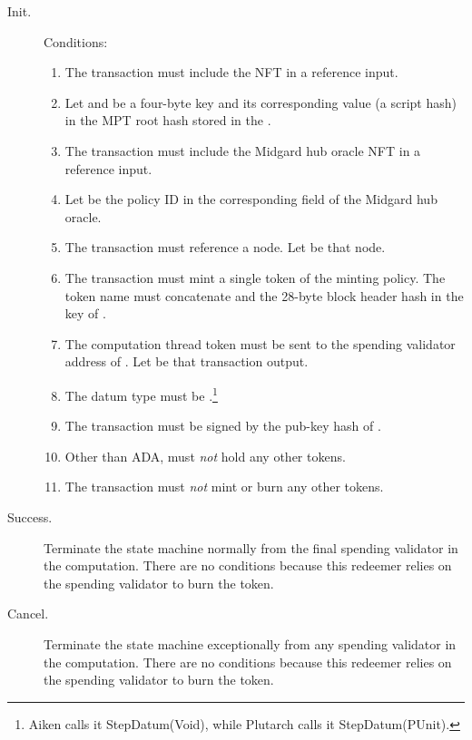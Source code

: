\documentclass[../midgard.tex]{subfiles}
\begin{document}
\begin{description}
    \item[Init.] Conditions:
        \begin{enumerate}
            \item The transaction must include the  NFT in a reference input.
            \item Let  and  be a four-byte key and its corresponding value (a script hash) in the MPT root hash stored in the .
            \item The transaction must include the Midgard hub oracle NFT in a reference input.
            \item Let  be the policy ID in the corresponding field of the Midgard hub oracle.
            \item The transaction must reference a  node.
              Let  be that node.
            \item The transaction must mint a single token of the  minting policy.
              The token name must concatenate  and the 28-byte block header hash in the key of .
            \item The computation thread token must be sent to the spending validator address of .
              Let  be that transaction output.
            \item The  datum type must be .\footnote{Aiken calls it StepDatum(Void), while Plutarch calls it StepDatum(PUnit).} 
            \item The transaction must be signed by the  pub-key hash of .
            \item Other than ADA,  must \emph{not} hold any other tokens.
            \item The transaction must \emph{not} mint or burn any other tokens.
        \end{enumerate}
    \item[Success.] Terminate the state machine normally from the final spending validator in the computation.
      There are no conditions because this redeemer relies on the spending validator to burn the token.
    \item[Cancel.] Terminate the state machine exceptionally from any spending validator in the computation.
      There are no conditions because this redeemer relies on the spending validator to burn the token.
\end{description}
\end{document}
